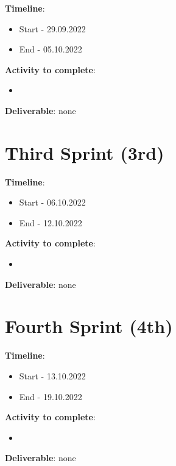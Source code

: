 \textbf{Timeline}:
\begin{itemize}
    \item Start - 29.09.2022
	\item End - 05.10.2022
\end{itemize}

\newpage

\textbf{Activity to complete}:
\begin{itemize}
    \item {}
\end{itemize}

\textbf{Deliverable}: none

\section{Third Sprint (3rd)}
\label{sec:planning_third}

\textbf{Timeline}:
\begin{itemize}
    \item Start - 06.10.2022
	\item End - 12.10.2022
\end{itemize}

\textbf{Activity to complete}:
\begin{itemize}
    \item {}
\end{itemize}

\textbf{Deliverable}: none

\section{Fourth Sprint (4th)}
\label{sec:planning_fourth}

\textbf{Timeline}:
\begin{itemize}
    \item Start - 13.10.2022
	\item End - 19.10.2022
\end{itemize}

\textbf{Activity to complete}:
\begin{itemize}
    \item {}
\end{itemize}

\textbf{Deliverable}: none

